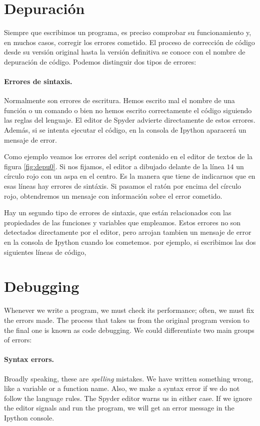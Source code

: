 \begin{paracol}{2}
\section{Depuración}
Siempre que escribimos un programa, es preciso comprobar su funcionamiento y, en  muchos casos, corregir los errores cometido. El proceso de corrección de código desde su versión original hasta la versión definitiva se conoce con el nombre de depuración de código. Podemos distinguir dos tipos de errores:

\paragraph{Errores de sintaxis.} Normalmente son errores de escritura. Hemos escrito mal el nombre de una función o un comando o bien no hemos escrito correctamente el código siguiendo las reglas del lenguaje. El editor de Spyder advierte directamente de estos errores. Además, si se intenta ejecutar el código, en la consola de Ipython aparacerá un mensaje de error. 

Como ejemplo veamos los errores del script contenido  en el editor de textos de la figura \ref{fig:depu0}. Si nos fijamos, el editor a dibujado delante de la línea $14$ un círculo rojo con un aspa en el centro. Es la manera que tiene de indicarnos que en esas líneas hay errores de sintáxis. Si pasamos el ratón por encima del círculo rojo, obtendremos un mensaje con información sobre el error cometido.

Hay un segundo tipo de errores de sintaxis, que están relacionados con las propiedades de las funciones y variables que empleamos. Estos errores no son detectados directamente por el editor, pero arrojan tambien un mensaje de error en la consola de Ipython cuando los cometemos. por ejemplo, si escribimos las dos siguientes líneas de código,
\switchcolumn
\section{Debugging}
Whenever we write a program, we must check its performance; often, we must fix the errors made. The process that takes us from the original program version to the final one is known as code debugging. We could differentiate two main groups of errors:

\paragraph{Syntax errors.} Broadly speaking, these are \emph{spelling} mistakes. We have written something wrong, like a variable or a function name. Also, we make a syntax error if we do not follow the language rules. The Spyder editor warns us in either case. If we ignore the editor signals and run the program, we will get an error message in the Ipython console. 


\end{paracol}
